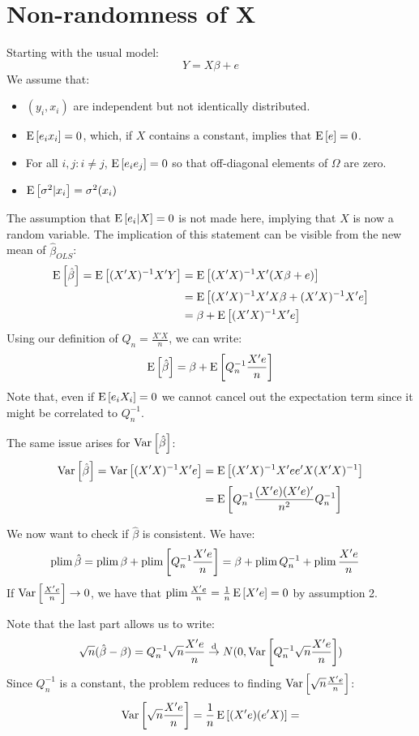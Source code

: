 \section{Non-randomness of X}

Starting with the usual model: $$Y = X\beta + e$$ We assume that:\begin{itemize}
\item $(y_i, x_i)$ are independent but not identically distributed.
\item $\operatorname{E}\left[e_ix_i\right] = 0$, which, if $X$ contains a constant, implies that $\operatorname{E}\left[e\right] = 0$.
\item For all $i,j: i\neq j$, $\operatorname{E}\left[e_ie_j\right] = 0$ so that off-diagonal elements of $\Omega$ are zero.
\item $\operatorname{E}\left[\sigma^2\vert x_i\right] = \sigma^2(x_i)$
\end{itemize}

The assumption that $\operatorname{E}\left[e_i\vert X\right] = 0 $ is not made here, implying that $X$ is now a random variable. The implication of this statement can be visible from the new mean of $\hat\beta_{OLS}$:\begin{align*}
\operatorname{E}\left[\hat\beta\right] = \operatorname{E}\left[(X'X)^{-1}X'Y\right] & = \operatorname{E}\left[(X'X)^{-1}X'(X\beta + e)\right] \\ & = \operatorname{E}\left[(X'X)^{-1}X'X\beta + (X'X)^{-1}X'e\right] \\
& = \beta + \operatorname{E}\left[(X'X)^{-1}X'e\right]
\end{align*} Using our definition of $Q_n = \frac{X'X}{n}$, we can write: $$ \operatorname{E}\left[\hat\beta\right] = \beta + \operatorname{E}\left[Q_n^{-1}\frac{X'e}{n}\right] $$ Note that, even if $\operatorname{E}\left[e_iX_i\right] = 0$ we cannot cancel out the expectation term since it might be correlated to $Q_n^{-1}$.

The same issue arises for $\operatorname{Var}\left[\hat\beta\right]$:\begin{align*}
\operatorname{Var}\left[\hat\beta\right] = \operatorname{Var}\left[(X'X)^{-1}X'e\right] & = \operatorname{E}\left[(X'X)^{-1}X'ee'X(X'X)^{-1}\right] \\
& = \operatorname{E}\left[Q_n^{-1}\frac{(X'e)(X'e)'}{n^2} Q_n^{-1}\right]
\end{align*}

We now want to check if $\hat\beta$ is consistent. We have:\begin{align*}
\operatorname{plim} \hat\beta = \operatorname{plim}\beta + \operatorname{plim}\left[Q_n^{-1}\frac{X'e}{n}\right] & = \beta + \operatorname{plim} Q_n^{-1} + \operatorname{plim} \frac{X'e}{n}
\end{align*} If $\operatorname{Var}\left[\frac{X'e}{n}\right] \to 0$, we have that $\operatorname{plim} \frac{X'e}{n} = \frac{1}{n}\operatorname{E}\left[X'e\right] = 0$ by assumption 2.

Note that the last part allows us to write: $$\sqrt{n}(\hat\beta - \beta) = Q_n^{-1}\sqrt{n}\frac{X'e}{n} \overset{\text{d}}{\to} N(0, \operatorname{Var}\left[Q_n^{-1}\sqrt{n}\frac{X'e}{n}\right])$$ Since $Q_n^{-1}$ is a constant, the problem reduces to finding $\operatorname{Var}\left[\sqrt{n}\frac{X'e}{n}\right]$:\begin{align*}
\operatorname{Var}\left[\sqrt{n}\frac{X'e}{n}\right] = \frac{1}{n}\operatorname{E}\left[(X'e)(e'X)\right] = 
\end{align*}



